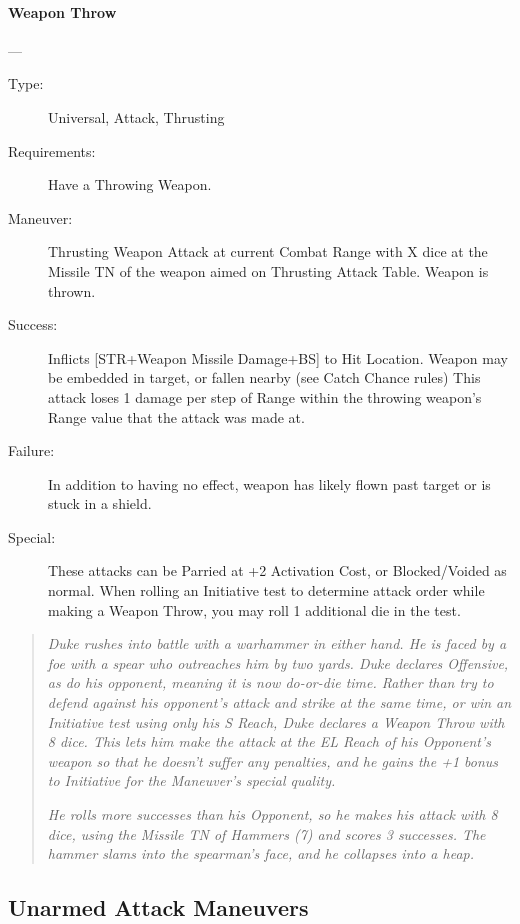 \documentclass[oneside,11pt,english]{book}
\begin{document}
\paragraph{\large\label{man:Weapon Throw}Weapon Throw}---\quad{\large[X+1]}
\vspace{-10pt}\begin{description} 
\item [Type:] Universal, Attack, Thrusting 
\item [Requirements:] Have a Throwing Weapon. 
\item [Maneuver:] Thrusting Weapon Attack at current Combat Range with X dice at
  the Missile TN of the weapon aimed on Thrusting Attack Table. Weapon is
  thrown.  
\item [Success:] Inflicts [STR+Weapon Missile Damage+BS] to Hit Location. Weapon
  may be embedded in target, or fallen nearby (see Catch Chance rules) This
  attack loses 1 damage per step of Range within the throwing weapon’s Range
  value that the attack was made at.  
\item [Failure:] In addition to having no effect, weapon has likely flown past
  target or is stuck in a shield.  
\item [Special:] These attacks can be Parried at +2 Activation Cost, or
  Blocked/Voided as normal. When rolling an Initiative test to determine attack
  order while making a Weapon Throw, you may roll 1 additional die in the test. 
\end{description}
\begin{quotation}
  \emph{Duke rushes into battle with a warhammer in either hand. He is faced by
    a foe with a spear who outreaches him by two yards. Duke declares Offensive,
    as do his opponent, meaning it is now do-or-die time. Rather than try to
    defend against his opponent’s attack and strike at the same time, or win an
    Initiative test using only his S Reach, Duke declares a Weapon Throw with 8
    dice. This lets him make the attack at the EL Reach of his Opponent’s weapon
    so that he doesn’t suffer any penalties, and he gains the +1 bonus to
    Initiative for the Maneuver’s special quality.} 

  \emph{He rolls more successes than his Opponent, so he makes his attack with 8
    dice, using the Missile TN of Hammers (7) and scores 3 successes. The hammer
    slams into the spearman’s face, and he collapses into a heap. } 
\end{quotation}


\subsection{Unarmed Attack Maneuvers}
\end{document}
